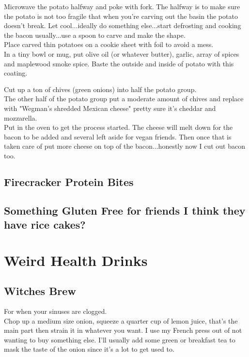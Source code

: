 \documentclass{article}
\begin{document}
Microwave the potato halfway and poke with fork. The halfway is to make sure the potato is not too fragile that when you're carving out the basin the potato doesn't break. Let cool...ideally do something else...start defrosting and cooking the bacon usually...use a spoon to carve and make the shape. \\ 
Place carved thin potatoes on a cookie sheet with foil to avoid a mess. \\
In a tiny bowl or mug, put olive oil (or whatever butter), garlic, array of spices and maplewood smoke spice. Baste the outside and inside of potato with this coating. 

Cut up a ton of chives (green onions) into half the potato group. \\ 
The other half of the potato group put a moderate amount of chives and replace with "Wegman's shredded Mexican cheese" pretty sure it's cheddar and mozzarella. \\ 
Put in the oven to get the process started. The cheese will melt down for the bacon to be added and several left aside for vegan friends. Then once that is taken care of put more cheese on top of the bacon...honestly now I cut out bacon too. \\ 
\subsection*{Firecracker Protein Bites}

\subsection*{Something Gluten Free for friends I think they have rice cakes?}



\section*{Weird Health Drinks}

\subsection*{Witches Brew} 
For when your sinuses are clogged. \\ 
Chop up a medium size onion, squeeze a quarter cup of lemon juice, that's the main part then strain it in whatever you want. I use my French press out of not wanting to buy something else. I'll usually add some green or breakfast tea to mask the taste of the onion since it's a lot to get used to. 
\end{document}
